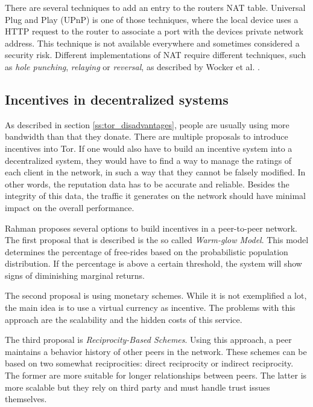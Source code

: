 \documentclass{article}
\begin{document}
		There are several techniques to add an entry to the routers NAT table. Universal Plug and Play (UPnP) is one of those techniques, where the local device uses a HTTP request to the router to associate a port with the devices private network address. This technique is not available everywhere and sometimes considered a security risk. Different implementations of NAT require different techniques, such as \textit{hole punching}, \textit{relaying} or \textit{reversal}, as described by Wocker et al. \cite{wacker2008nat}.

	\subsection{Incentives in decentralized systems}
		As described in section \ref{ss:tor_disadvantages}, people are usually using more bandwidth than that they donate. There are multiple proposals \cite{dingledine2010building, jansen13lira} to introduce incentives into Tor. If one would also have to build an incentive system into a decentralized system, they would have to find a way to manage the ratings of each client in the network, in such a way that they cannot be falsely modified. In other words, the reputation data has to be accurate and reliable. Besides the integrity of this data, the traffic it generates on the network should have minimal impact on the overall performance.
		
		Rahman \cite{rahman2009survey} proposes several options to build incentives in a peer-to-peer network. The first proposal that is described is the so called \emph{Warm-glow Model}. This model determines the percentage of free-rides based on the probabilistic population distribution. If the percentage is above a certain threshold, the system will show signs of diminishing marginal returns.
		
		The second proposal is using monetary schemes. While it is not exemplified a lot, the main idea is to use a virtual currency as incentive. The problems with this approach are the scalability and the hidden costs of this service.
		
		The third proposal is \emph{Reciprocity-Based Schemes}. Using this approach, a peer maintains a behavior history of other peers in the network. These schemes can be based on two somewhat reciprocities: direct reciprocity or indirect reciprocity. The former are more suitable for longer relationships between peers. The latter is more scalable but they rely on third party and must handle trust issues themselves.
\end{document}
